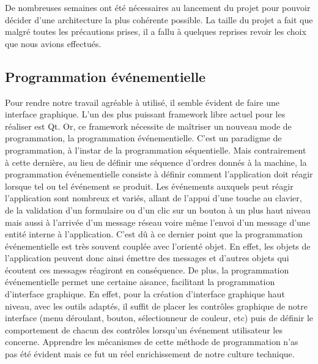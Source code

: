 De nombreuses semaines ont été nécessaires au lancement du projet pour pouvoir décider d'une architecture la plus cohérente possible. La taille du projet a fait que malgré toutes les précautions prises, il a fallu à quelques reprises revoir les choix que nous avions effectués.




\subsection{Programmation événementielle}

Pour rendre notre travail agréable à utilisé, il semble évident de faire une interface graphique. L'un des plus puissant framework libre actuel pour les réaliser est Qt. Or, ce framework nécessite de maîtriser un nouveau mode de programmation, la programmation événementielle. C'est un paradigme de programmation, à l'instar de la programmation séquentielle. Mais contrairement à cette dernière, au lieu de définir une séquence d'ordres donnés à la machine, la programmation événementielle consiste à définir comment l'application doit réagir lorsque tel ou tel événement se produit. Les événements auxquels peut réagir l'application sont nombreux et variés, allant de l'appui d'une touche au clavier, de la validation d'un formulaire ou d'un clic sur un bouton à un plus haut niveau mais aussi à l'arrivée d'un message réseau voire même l'envoi d'un message d'une entité interne à l'application. C'est dû à ce dernier point que la programmation événementielle est très souvent couplée avec l'orienté objet. En effet, les objets de l'application peuvent donc ainsi émettre des messages et d'autres objets qui écoutent ces messages réagiront en conséquence. De plus, la programmation événementielle permet une certaine aisance, facilitant la programmation d'interface graphique. En effet, pour la création d'interface graphique haut niveau, avec les outils adaptés, il suffit de placer les contrôles graphique de notre interface (menu déroulant, bouton, sélectionneur de couleur, etc) puis de définir le comportement de chacun des contrôles lorsqu'un événement utilisateur les concerne. Apprendre les mécanismes de cette méthode de programmation n'as pas été évident mais ce fut un réel enrichissement de notre culture technique. 


